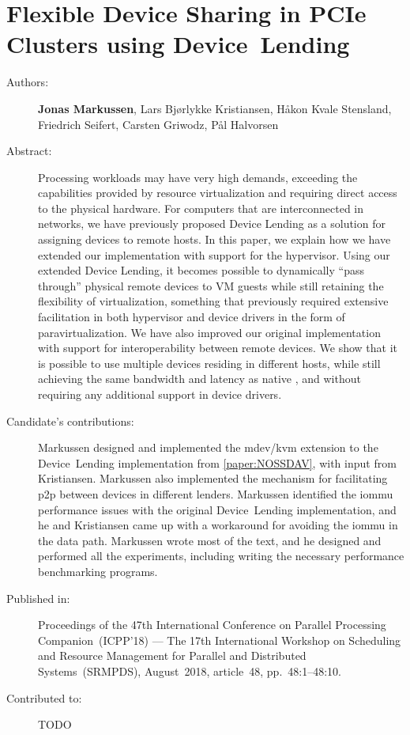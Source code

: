 \chapter{Flexible Device Sharing in PCIe Clusters using Device~Lending}
\label{paper:SRMPDS}
\paperthumb

\begin{description}
	\item[Authors:]
		\textbf{Jonas Markussen}, Lars Bj{\o}rlykke Kristiansen, H{\aa}kon Kvale Stensland,
		Friedrich Seifert, Carsten Griwodz, P{\aa}l Halvorsen

	\item[Abstract:]
		Processing workloads may have very high  demands, exceeding the capabilities provided by resource
		virtualization and requiring direct access to the physical hardware.
		For computers that are interconnected in  networks, we have previously proposed 
		Device Lending as a solution for assigning devices to remote hosts. In this paper, we
		explain how we have extended our implementation with support for the  hypervisor.
		Using our extended Device Lending, it becomes possible to dynamically ``pass through'' physical remote devices
		to VM guests while still retaining the flexibility of virtualization, something that previously required
		extensive facilitation in both hypervisor and device drivers in the form of \gls{paravirtualization}.
		We have also improved our original implementation with support for interoperability between remote devices.
		We show that it is possible to use multiple devices residing in different hosts, while still achieving the same
		bandwidth and latency as native , and without requiring any additional support in device drivers. 


	\item[Candidate's contributions:]
		Markussen designed and implemented the \acrshort{mdev}/\acrshort{kvm} extension to the Device~Lending implementation from \cref{paper:NOSSDAV}, with input from Kristiansen.
		Markussen also implemented the mechanism for facilitating \acrshort{p2p} between devices
		in different lenders.
		Markussen identified the \acrshort{iommu} performance issues with the original Device~Lending implementation, and he and Kristiansen came up with a workaround for avoiding the \acrshort{iommu} in the data path. 
		Markussen wrote most of the text, and he designed and performed all the experiments, including writing the necessary performance benchmarking programs.

	\item[Published in:]
		Proceedings of the 47th International Conference on Parallel Processing Companion~(ICPP'18) ---
		The 17th International Workshop on Scheduling and Resource Management for Parallel and Distributed Systems~(SRMPDS),
		August~2018, article~48, pp.~48:1--48:10.

	\item[Contributed to:]
		TODO

\end{description}
